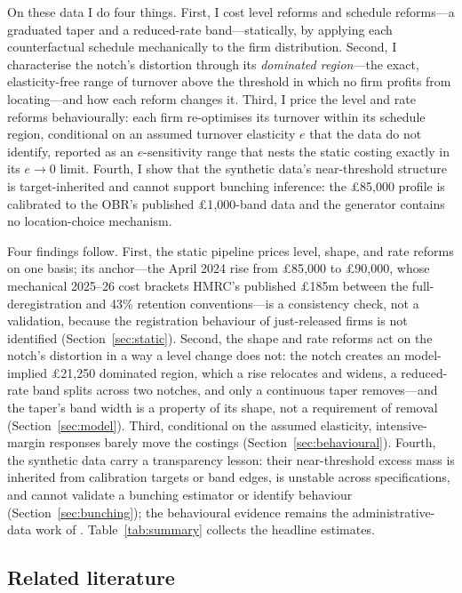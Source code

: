 On these data I do four things. First, I cost level reforms and schedule reforms---a graduated taper and a reduced-rate band---statically, by applying each counterfactual schedule mechanically to the firm distribution. Second, I characterise the notch's distortion through its \emph{dominated region}---the exact, elasticity-free range of turnover above the threshold in which no firm profits from locating---and how each reform changes it. Third, I price the level and rate reforms behaviourally: each firm re-optimises its turnover within its schedule region, conditional on an assumed turnover elasticity $e$ that the data do not identify, reported as an $e$-sensitivity range that nests the static costing exactly in its $e\to0$ limit. Fourth, I show that the synthetic data's near-threshold structure is target-inherited and cannot support bunching inference: the \pounds85{,}000 profile is calibrated to the OBR's published \pounds1{,}000-band data and the generator contains no location-choice mechanism.

Four findings follow. First, the static pipeline prices level, shape, and
rate reforms on one basis; its anchor---the April 2024 rise from
\pounds85{,}000 to \pounds90{,}000, whose mechanical 2025--26 cost brackets
HMRC's published \pounds185m between the full-deregistration and 43\%
retention conventions---is a consistency check, not a validation, because the
registration behaviour of just-released firms is not identified
(Section~\ref{sec:static}). Second, the shape and rate reforms act on the
notch's distortion in a way a level change does not: the notch creates an
model-implied \pounds21{,}250 dominated region, which a rise relocates and widens, a
reduced-rate band splits across two notches, and only a continuous taper
removes---and the taper's band width is a property of its shape, not a
requirement of removal (Section~\ref{sec:model}). Third, conditional on the
assumed elasticity, intensive-margin responses barely move the costings
(Section~\ref{sec:behavioural}). Fourth, the synthetic data carry a
transparency lesson: their near-threshold excess mass is inherited from
calibration targets or band edges, is unstable across specifications, and
cannot validate a bunching estimator or identify behaviour
(Section~\ref{sec:bunching}); the behavioural evidence remains the
administrative-data work of \citet{liuetal2021}. Table~\ref{tab:summary}
collects the headline estimates.

\subsection*{Related literature}

